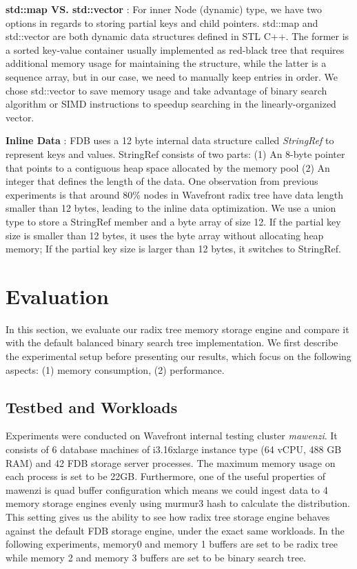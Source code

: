 \documentclass[sigplan,screen,nonacm]{acmart}
\begin{document}
\textbf {std::map VS. std::vector} : For inner Node (dynamic) type, we have two options in regards to storing partial keys and child pointers. std::map and std::vector are both dynamic data structures defined in STL C++. The former is a sorted key-value container  usually implemented as red-black tree that requires additional memory usage for maintaining the structure, while the latter is a sequence array, but in our case, we need to manually keep entries in order. We chose std::vector to save memory usage and take advantage of binary search algorithm or SIMD instructions to speedup searching in the linearly-organized vector. 

\textbf {Inline Data} :  FDB uses a 12 byte internal data structure called {\itshape StringRef} to represent keys and values. StringRef consists of two parts: (1) An 8-byte pointer that points to a contiguous heap space allocated by the memory pool (2) An integer that defines the length of the data. One observation from previous experiments is that around 80\% nodes in Wavefront radix tree have data length smaller than 12 bytes, leading to the inline data optimization. We use a union type to store a StringRef member and a byte array of size 12. If the partial key size is smaller than 12 bytes, it uses the byte array without allocating heap memory; If the partial key size is larger than 12 bytes, it switches to StringRef. 

\section{Evaluation}
In this section, we evaluate our radix tree memory storage engine and compare it with the default balanced binary search tree implementation. We first describe the experimental setup before presenting our results, which focus on the following aspects: (1) memory consumption, (2) performance. 
 
\subsection{Testbed and Workloads}
Experiments were conducted on Wavefront internal testing cluster {\itshape mawenzi}. It consists of 6 database machines of i3.16xlarge instance type (64 vCPU, 488 GB RAM) and 42 FDB storage server processes. The maximum memory usage on each process is set to be 22GB. Furthermore, one of the useful properties of mawenzi is quad buffer configuration which means we could ingest data to 4 memory storage engines evenly using murmur3 hash to calculate the distribution. This setting gives us the ability to see how radix tree storage engine behaves against the default FDB storage engine, under the exact same workloads. In the following experiments, memory0 and memory 1 buffers are set to be radix tree while memory 2 and memory 3 buffers are set to be binary search tree. 
\end{document}
